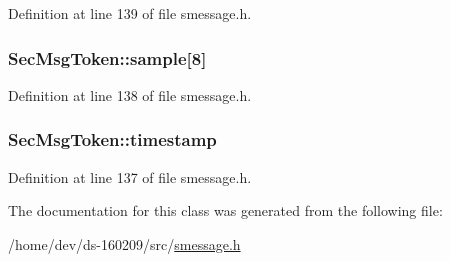 Definition at line 139 of file smessage.\+h.

\hypertarget{class_sec_msg_token_a5cda3c8fcc7e167458c7b28bd6acc9e4}{}
\subsubsection[{sample}]{ Sec\+Msg\+Token\+::sample\mbox{[}8\mbox{]}}\label{class_sec_msg_token_a5cda3c8fcc7e167458c7b28bd6acc9e4}


Definition at line 138 of file smessage.\+h.

\hypertarget{class_sec_msg_token_ae38e93419379e9d202e386aa9dda193b}{}
\subsubsection[{timestamp}]{ Sec\+Msg\+Token\+::timestamp}\label{class_sec_msg_token_ae38e93419379e9d202e386aa9dda193b}


Definition at line 137 of file smessage.\+h.



The documentation for this class was generated from the following file\+:\begin{DoxyCompactItemize}
\item 
/home/dev/ds-\/160209/src/\hyperlink{smessage_8h}{smessage.\+h}\end{DoxyCompactItemize}
